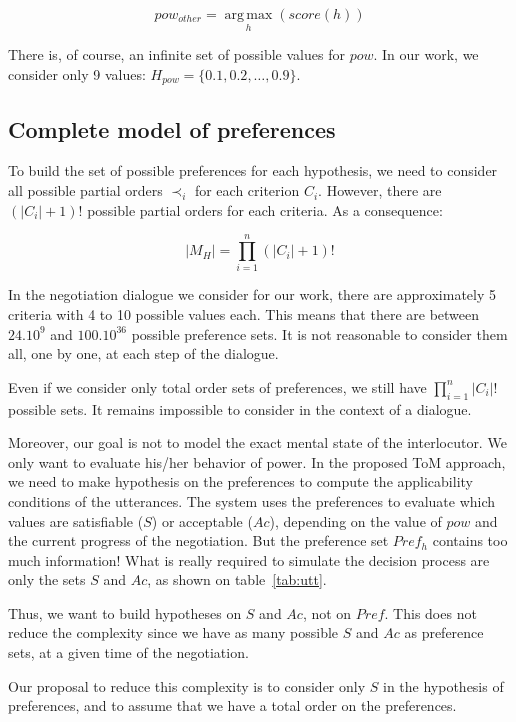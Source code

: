 \documentclass[sigconf]{aamas}  %
\begin{document}
	\begin{equation}
	pow_{other} = \operatorname*{arg\,max}_{h} (score(h))
	\end{equation}

	There is, of course, an infinite set of possible values for $pow$. In our work, we consider only 9 values: $H_{pow} = \{0.1, 0.2, \ldots, 0.9\}$.

	\subsection{Complete model of preferences}
	
	To build the set of possible preferences for each hypothesis, we need to consider all possible partial orders $\prec_i$ for each criterion $C_i$. However, there are $(|C_i| + 1)!$ possible partial orders for each criteria. As a consequence:
	
	$$ |M_H| = \prod_{i=1}^n (|C_i|+1)!$$
	
	In the negotiation dialogue we consider for our work, there are approximately 5 criteria with 4 to 10 possible values each. This means that there are between $24.10^9$ and $100.10^{36}$ possible preference sets. It is not reasonable to consider them all, one by one, at each step of the dialogue.
	
	Even if we consider only total order sets of preferences, we still have  $\prod_{i=1}^n |C_i|!$ possible sets. It remains impossible to consider in the context of a dialogue.
	
	Moreover, our goal is not to model the exact mental state of the interlocutor. We only want to evaluate his/her behavior of power. In the proposed ToM approach, we need to make hypothesis on the preferences to compute the applicability conditions of the utterances. The system uses the preferences to evaluate which values are satisfiable ($S$) or acceptable ($Ac$), depending on the value of $pow$ and the current progress of the negotiation. But the preference set $Pref_h$ contains too much information! What is really required to simulate the decision process are only the sets $S$ and $Ac$, as shown on table~\ref{tab:utt}.
	
	Thus, we want to build hypotheses on $S$ and $Ac$, not on $Pref$. This does not reduce the complexity since we have as many possible $S$ and $Ac$ as preference sets, at a given time of the negotiation.
	
	Our proposal to reduce this complexity is to consider only $S$ in the hypothesis of preferences, and to assume that we have a total order on the preferences.
	
\end{document}
